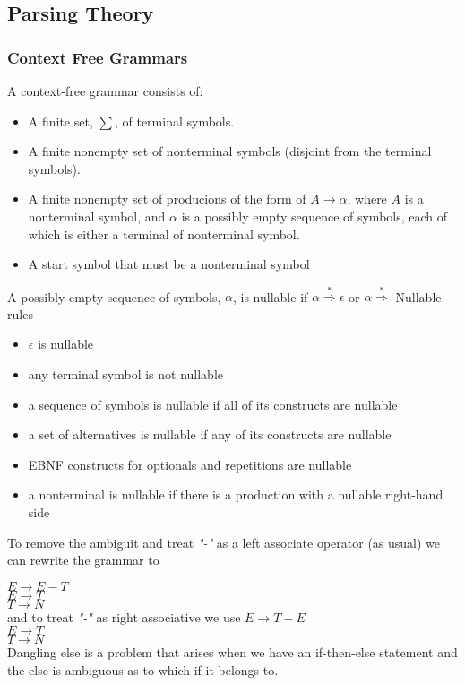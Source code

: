 \subsection{Parsing Theory}

\subsubsection{Context Free Grammars}
A context-free grammar consists of:
\begin{itemize}
\item A finite set, $\sum$,  of terminal symbols.
\item A finite nonempty set of nonterminal symbols (disjoint from the terminal symbols).
\item A finite nonempty set of producions of the form of $A \rightarrow \alpha$, where $A$ is a nonterminal symbol, and $\alpha$ is a possibly empty sequence of symbols, each of which is either a terminal of nonterminal symbol.
\item A start symbol that must be a nonterminal symbol
\end{itemize}

A possibly empty sequence of symbols, $\alpha$, is nullable if  $\alpha \stackrel{*}{\Rightarrow} \epsilon$ or $\alpha \stackrel{*}{\Rightarrow}$
Nullable rules
\begin{itemize}
        \item $\epsilon$ is nullable
        \item any terminal symbol is not nullable
        \item a sequence of symbols is nullable if all of its constructs are nullable
        \item a set of alternatives is nullable if any of its constructs are nullable
        \item EBNF constructs for optionals and repetitions are nullable
        \item a nonterminal is nullable if there is a production with a nullable right-hand side
\end{itemize}

To remove the ambiguit and treat \emph{"-"} as  a left associate operator (as usual) we can rewrite the grammar to

$E \rightarrow E - T$ \\
$E \rightarrow T$ \\
$T \rightarrow N$ \\
and to treat \emph{"-"} as right associative we use
$E \rightarrow T - E$ \\
$E \rightarrow T$ \\
$T \rightarrow N$ \\

Dangling else is a problem that arises when we have an if-then-else statement and the else is ambiguous as to which if it belongs to.